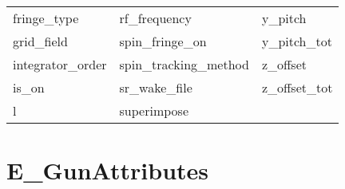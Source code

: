 \begin{tabular}{lll}
fringe_type                 & rf_frequency                & y_pitch                     \\
grid_field                  & spin_fringe_on              & y_pitch_tot                 \\
integrator_order            & spin_tracking_method        & z_offset                    \\
is_on                       & sr_wake_file                & z_offset_tot                \\
l                           & superimpose                 &                             \\
 \bottomrule
 \end{tabular}
 \vfill
 
 \section{E_GunAttributes}
 \label{s:list.e.gun}
 
